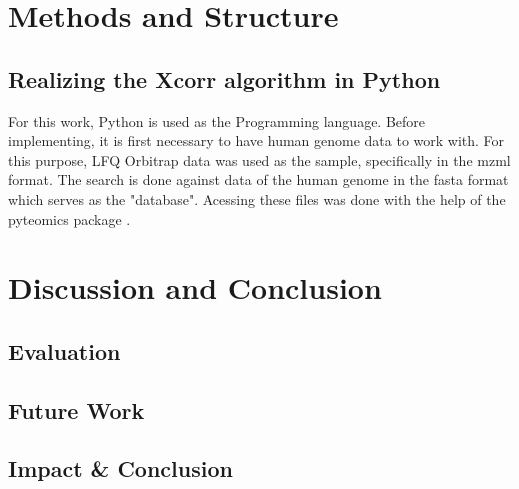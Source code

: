 \documentclass[12pt]{article}
\begin{document}
\section{Methods and Structure}
\subsection{Realizing the Xcorr algorithm in Python}
For this work, Python is used as the Programming language. Before implementing, it is first necessary to have human genome data to work with. For this purpose, LFQ Orbitrap data was used as the sample, specifically in the mzml format. The search is done against data of the human genome in the fasta format which serves as the "database".
Acessing these files was done with the help of the pyteomics package \cite{pyteomics, pyteomics-five-years}.



\section{Discussion and Conclusion}
\subsection{Evaluation}
\subsection{Future Work}
\subsection{Impact \& Conclusion}


\printbibliography
\end{document}
